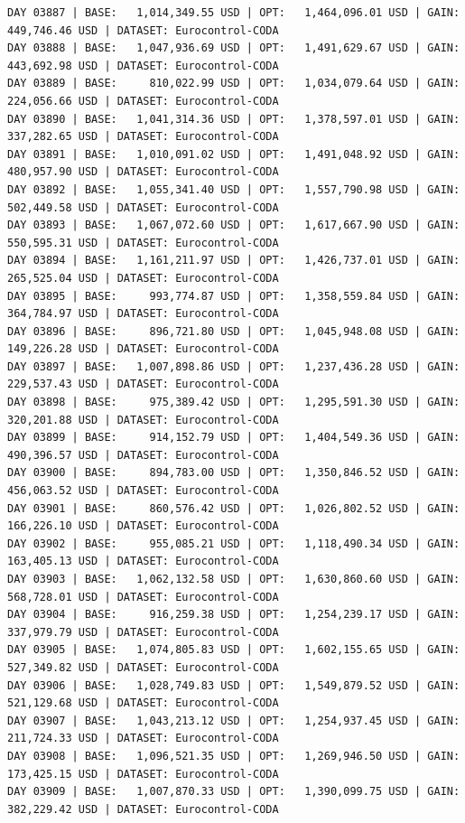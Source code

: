 \documentclass[11pt,a4paper]{article}
\begin{document}
\begin{verbatim}
DAY 03887 | BASE:   1,014,349.55 USD | OPT:   1,464,096.01 USD | GAIN: 449,746.46 USD | DATASET: Eurocontrol-CODA
DAY 03888 | BASE:   1,047,936.69 USD | OPT:   1,491,629.67 USD | GAIN: 443,692.98 USD | DATASET: Eurocontrol-CODA
DAY 03889 | BASE:     810,022.99 USD | OPT:   1,034,079.64 USD | GAIN: 224,056.66 USD | DATASET: Eurocontrol-CODA
DAY 03890 | BASE:   1,041,314.36 USD | OPT:   1,378,597.01 USD | GAIN: 337,282.65 USD | DATASET: Eurocontrol-CODA
DAY 03891 | BASE:   1,010,091.02 USD | OPT:   1,491,048.92 USD | GAIN: 480,957.90 USD | DATASET: Eurocontrol-CODA
DAY 03892 | BASE:   1,055,341.40 USD | OPT:   1,557,790.98 USD | GAIN: 502,449.58 USD | DATASET: Eurocontrol-CODA
DAY 03893 | BASE:   1,067,072.60 USD | OPT:   1,617,667.90 USD | GAIN: 550,595.31 USD | DATASET: Eurocontrol-CODA
DAY 03894 | BASE:   1,161,211.97 USD | OPT:   1,426,737.01 USD | GAIN: 265,525.04 USD | DATASET: Eurocontrol-CODA
DAY 03895 | BASE:     993,774.87 USD | OPT:   1,358,559.84 USD | GAIN: 364,784.97 USD | DATASET: Eurocontrol-CODA
DAY 03896 | BASE:     896,721.80 USD | OPT:   1,045,948.08 USD | GAIN: 149,226.28 USD | DATASET: Eurocontrol-CODA
DAY 03897 | BASE:   1,007,898.86 USD | OPT:   1,237,436.28 USD | GAIN: 229,537.43 USD | DATASET: Eurocontrol-CODA
DAY 03898 | BASE:     975,389.42 USD | OPT:   1,295,591.30 USD | GAIN: 320,201.88 USD | DATASET: Eurocontrol-CODA
DAY 03899 | BASE:     914,152.79 USD | OPT:   1,404,549.36 USD | GAIN: 490,396.57 USD | DATASET: Eurocontrol-CODA
DAY 03900 | BASE:     894,783.00 USD | OPT:   1,350,846.52 USD | GAIN: 456,063.52 USD | DATASET: Eurocontrol-CODA
DAY 03901 | BASE:     860,576.42 USD | OPT:   1,026,802.52 USD | GAIN: 166,226.10 USD | DATASET: Eurocontrol-CODA
DAY 03902 | BASE:     955,085.21 USD | OPT:   1,118,490.34 USD | GAIN: 163,405.13 USD | DATASET: Eurocontrol-CODA
DAY 03903 | BASE:   1,062,132.58 USD | OPT:   1,630,860.60 USD | GAIN: 568,728.01 USD | DATASET: Eurocontrol-CODA
DAY 03904 | BASE:     916,259.38 USD | OPT:   1,254,239.17 USD | GAIN: 337,979.79 USD | DATASET: Eurocontrol-CODA
DAY 03905 | BASE:   1,074,805.83 USD | OPT:   1,602,155.65 USD | GAIN: 527,349.82 USD | DATASET: Eurocontrol-CODA
DAY 03906 | BASE:   1,028,749.83 USD | OPT:   1,549,879.52 USD | GAIN: 521,129.68 USD | DATASET: Eurocontrol-CODA
DAY 03907 | BASE:   1,043,213.12 USD | OPT:   1,254,937.45 USD | GAIN: 211,724.33 USD | DATASET: Eurocontrol-CODA
DAY 03908 | BASE:   1,096,521.35 USD | OPT:   1,269,946.50 USD | GAIN: 173,425.15 USD | DATASET: Eurocontrol-CODA
DAY 03909 | BASE:   1,007,870.33 USD | OPT:   1,390,099.75 USD | GAIN: 382,229.42 USD | DATASET: Eurocontrol-CODA

\end{verbatim}
\end{document}
